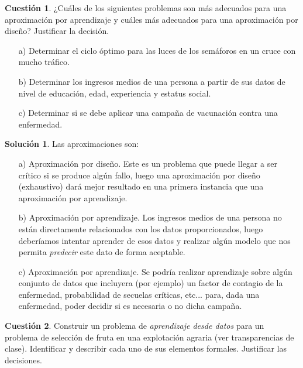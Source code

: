 \documentclass[a4paper, 11pt]{article}
\theoremstyle{definition}
\newtheorem{cuestion}{Cuestión}
\newtheorem*{solucion}{Solución}
\begin{document}
  \begin{cuestion}
    ¿Cuáles de los siguientes problemas son más adecuados para una aproximación por aprendizaje y cuáles más adecuados para una aproximación por diseño? Justificar la decisión.
    \begin{enumerate}
      \item[a)] Determinar el ciclo óptimo para las luces de los semáforos en un cruce con mucho tráfico.
      \item[b)] Determinar los ingresos medios de una persona a partir de sus datos de nivel de educación, edad, experiencia y estatus social.
      \item[c)] Determinar si se debe aplicar una campaña de vacunación contra una enfermedad.
    \end{enumerate}

  \end{cuestion}

  \begin{solucion}
    Las aproximaciones son:
    \begin{enumerate}
      \item[a)] Aproximación por diseño. Este es un problema que puede llegar a ser crítico si se produce algún fallo, luego una aproximación por diseño (exhaustivo) dará mejor resultado en una primera instancia que una aproximación por aprendizaje.
      \item[b)] Aproximación por aprendizaje. Los ingresos medios de una persona no están directamente relacionados con los datos proporcionados, luego deberíamos intentar aprender de esos datos y realizar algún modelo que nos permita \emph{predecir} este dato de forma aceptable.
      \item[c)] Aproximación por aprendizaje. Se podría realizar aprendizaje sobre algún conjunto de datos que incluyera (por ejemplo) un factor de contagio de la enfermedad, probabilidad de secuelas críticas, etc... para, dada una enfermedad, poder decidir si es necesaria o no dicha campaña.
    \end{enumerate}
  \end{solucion}

  \begin{cuestion}
  Construir un problema de \emph{aprendizaje desde datos} para un problema de selección de fruta en una explotación agraria (ver transparencias de clase). Identificar y describir cada uno de sus elementos formales. Justificar las decisiones.
  \end{cuestion}
\end{document}
